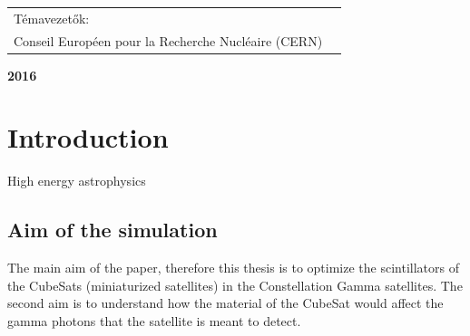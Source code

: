\documentclass[12pt, a4paper,titlepage]{article}
\numberwithin{equation}{section}
\numberwithin{figure}{section}
\begin{document}
\begin{titlepage}
\begin{center}



\vspace{0.1 cm}
\end{center}

\begin{center}
\begin{tabular}{ll}
\centerline{ Témavezetők: } \\
\centerline{ Conseil Européen pour la Recherche Nucléaire (CERN)}
\end{tabular}
\end{center}
\begin{center}

\vspace{2.5 cm}
\large \textbf {2016}\\
\end{center}
\end{titlepage}
\tableofcontents
{}



\pagebreak
{}
\setcounter{page}{1}




\section{Introduction}

High energy astrophysics

\subsection{Aim of the simulation}

The main aim of the paper, therefore this thesis is to optimize the scintillators of the CubeSats (miniaturized satellites) in the Constellation Gamma satellites. The second aim is to understand how the material of the CubeSat would affect the gamma photons that the satellite is meant to detect.
\end{document}

